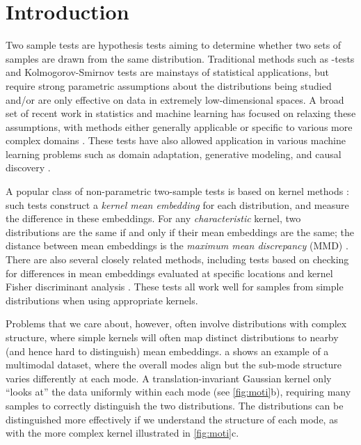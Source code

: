 \documentclass{article}
\begin{document}
\section{Introduction}

Two sample tests are hypothesis tests aiming to determine whether two sets of samples are drawn from the same distribution.
Traditional methods such as -tests and Kolmogorov-Smirnov tests are mainstays of statistical applications,
but require strong parametric assumptions about the distributions being studied
and/or are only effective on data in extremely low-dimensional spaces.
A broad set of
recent work in statistics and machine learning
has focused on relaxing these assumptions,
with methods either generally applicable
or specific to various more complex domains
\citep{Gretton2012,Szekely2013,Heller2016,Jitkrittum2016,RamdasGarciaCuturi,Lopez:C2ST,Chen2017,Gao18neurips,Ghoshdastidar2017,Graph_two_sample,LiW18TIT,Matthias:deep-test}.
These tests have also allowed application in various machine learning problems such as domain adaptation, generative modeling, and causal discovery \citep{MMD_GAN,Gong2016,DA_app_Stojanov,Lopez:C2ST}.

A popular class of
non-parametric two-sample tests is based on kernel methods \citep{smola1998learning}: such tests construct a
\emph{kernel mean embedding} \citep{BerTho04,Muandet2017} for each distribution, and measure the difference in these embeddings.
For any \emph{characteristic} kernel, two distributions are the same if and only if their mean embeddings are the same;
the distance between mean embeddings is the \emph{maximum mean discrepancy} (MMD) \citep{Gretton2012}.
There are also several closely related methods,
including tests based on checking for differences in mean embeddings evaluated at specific locations \citep{Chwialkowski2015,Jitkrittum2016}
and kernel Fisher discriminant analysis \citep{Harchaoui2007}.
These tests all work well for samples from simple distributions when using appropriate kernels.

Problems that we care about, however,
often involve distributions with complex structure,
where simple kernels will often map distinct distributions to nearby (and hence hard to distinguish) mean embeddings.
a shows an example of a multimodal dataset,
where the overall modes align but the sub-mode structure varies differently at each mode.
A translation-invariant Gaussian kernel only ``looks at'' the data uniformly within each mode (see \cref{fig:moti}b),
requiring many samples to correctly distinguish the two distributions.
The distributions can be distinguished more effectively if we understand the structure of each mode,
as with the more complex kernel illustrated in \cref{fig:moti}c.
\end{document}
